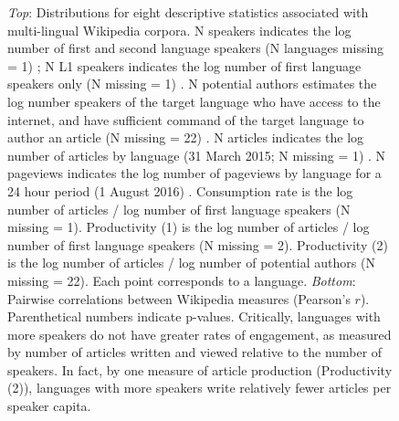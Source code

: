 \documentclass[9pt,twoside,lineno]{pnas-new}
\begin{document}
\begin{figure}
  \caption{{\it Top}: Distributions for eight descriptive statistics associated with multi-lingual Wikipedia corpora. N speakers indicates the log number of first and second language speakers (N languages missing = 1) \cite{wikispeakers}; N L1 speakers indicates the log number of first language speakers only (N missing = 1) \cite{amano2014global}. N potential authors estimates the log number speakers of the target language who have access to the internet, and have sufficient command of the target language to author an article (N  missing = 22) \cite{wikiproductivity}. N articles indicates the log number of articles by language (31 March 2015; N  missing = 1) \cite{wikispeakers}. N pageviews indicates the log number of pageviews by language for a 24 hour period (1 August 2016) \cite{wikipageview}. Consumption rate is the log number of articles / log number of first language speakers (N  missing = 1). Productivity (1) is the log number of articles / log number of first language speakers (N  missing = 2). Productivity (2) is the log number of articles / log number of potential authors (N  missing = 22). Each point corresponds to a language. {\it Bottom}: Pairwise correlations between Wikipedia measures (Pearson's $r$). Parenthetical numbers indicate p-values. Critically, languages with more speakers do not have greater rates of engagement, as measured by number of articles written and viewed relative to the number of speakers. In fact, by one measure of article production (Productivity (2)), languages with more speakers write relatively fewer articles per speaker capita.}
\end{figure}

\pagebreak
\clearpage


\end{document}
